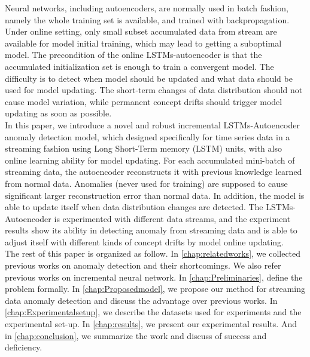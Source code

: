 Neural networks, including autoencoders, are normally used in batch fashion, namely the whole training set is available, and trained with backpropagation. Under online setting, only small subset accumulated data from stream are available for model initial training, which may lead to getting a suboptimal model. The precondition of the online LSTMs-autoencoder is that the accumulated initialization set is enough to train a convergent model. The difficulty is to detect when model should be updated and what data should be used for model updating. The short-term changes of data distribution should not cause model variation, while permanent concept drifts should trigger model updating as soon as possible.\\

In this paper, we introduce a novel and robust incremental LSTMs-Autoencoder anomaly detection model, which designed specifically for time series data in a streaming fashion using Long Short-Term memory (LSTM) units, with also online learning ability for model updating. For each accumulated mini-batch of streaming data, the autoencoder reconstructs it with previous knowledge learned from normal data. Anomalies (never used for training) are supposed to cause significant larger reconstruction error than normal data. In addition, the model is able to update itself when data distribution changes are detected. The LSTMs-Autoencoder is experimented with different data streams, and the experiment results show its ability in detecting anomaly from streaming data and is able to adjust itself with different kinds of concept drifts by model online updating.\\


The rest of this paper is organized as follow. In \autoref{chap:relatedworks}, we collected previous works on anomaly detection and their shortcomings. We also refer previous works on incremental neural network. In \autoref{chap:Preliminaries}, define the problem formally. In \autoref{chap:Proposedmodel}, we propose our method for streaming data anomaly detection and discuss the advantage over previous works. In \autoref{chap:Experimentalsetup}, we describe the datasets used for experiments and the experimental set-up. In \autoref{chap:results}, we present our experimental results. And in \autoref{chap:conclusion}, we summarize the work and discuss of success and deficiency.

